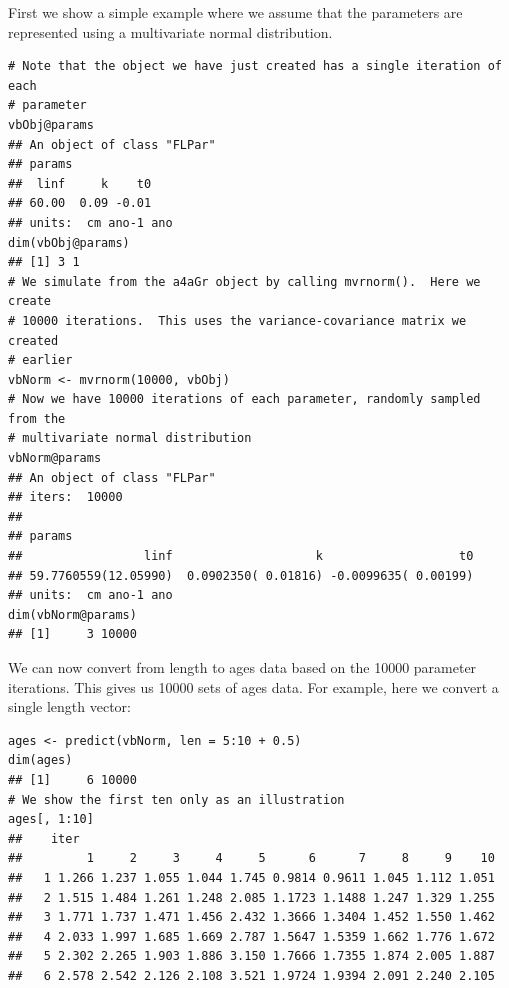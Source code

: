 \documentclass[a4paper,english,10pt]{article}\usepackage[]{graphicx}\usepackage[]{color}
\makeatletter
\newenvironment{kframe}{%
 \def\at@end@of@kframe{}%
 \ifinner\ifhmode%
  \def\at@end@of@kframe{\end{minipage}}%
  \begin{minipage}{\columnwidth}%
 \fi\fi%
 \def\FrameCommand##1{\hskip\@totalleftmargin \hskip-\fboxsep
 \colorbox{shadecolor}{##1}\hskip-\fboxsep
     \hskip-\linewidth \hskip-\@totalleftmargin \hskip\columnwidth}%
 \MakeFramed {\advance\hsize-\width
   \@totalleftmargin\z@ \linewidth\hsize
   \@setminipage}}%
 {\par\unskip\endMakeFramed%
 \at@end@of@kframe}
\newenvironment{knitrout}{}{} %
\newcommand{\code}[1]{{\texttt{#1}}}
\makeatother
\begin{document}
First we show a simple example where we assume that the parameters are represented using a multivariate normal distribution.

\begin{knitrout}
\color{fgcolor}\begin{kframe}
\begin{verbatim}
# Note that the object we have just created has a single iteration of each
# parameter
vbObj@params
## An object of class "FLPar"
## params
##  linf     k    t0 
## 60.00  0.09 -0.01 
## units:  cm ano-1 ano
dim(vbObj@params)
## [1] 3 1
# We simulate from the a4aGr object by calling mvrnorm().  Here we create
# 10000 iterations.  This uses the variance-covariance matrix we created
# earlier
vbNorm <- mvrnorm(10000, vbObj)
# Now we have 10000 iterations of each parameter, randomly sampled from the
# multivariate normal distribution
vbNorm@params
## An object of class "FLPar"
## iters:  10000 
## 
## params
##                 linf                    k                   t0 
## 59.7760559(12.05990)  0.0902350( 0.01816) -0.0099635( 0.00199) 
## units:  cm ano-1 ano
dim(vbNorm@params)
## [1]     3 10000
\end{verbatim}
\end{kframe}
\end{knitrout}


We can now convert from length to ages data based on the 10000 parameter iterations. This gives us 10000 sets of ages data. For example, here we convert a single length vector: 

\begin{knitrout}
\color{fgcolor}\begin{kframe}
\begin{verbatim}
ages <- predict(vbNorm, len = 5:10 + 0.5)
dim(ages)
## [1]     6 10000
# We show the first ten only as an illustration
ages[, 1:10]
##    iter
##         1     2     3     4     5      6      7     8     9    10
##   1 1.266 1.237 1.055 1.044 1.745 0.9814 0.9611 1.045 1.112 1.051
##   2 1.515 1.484 1.261 1.248 2.085 1.1723 1.1488 1.247 1.329 1.255
##   3 1.771 1.737 1.471 1.456 2.432 1.3666 1.3404 1.452 1.550 1.462
##   4 2.033 1.997 1.685 1.669 2.787 1.5647 1.5359 1.662 1.776 1.672
##   5 2.302 2.265 1.903 1.886 3.150 1.7666 1.7355 1.874 2.005 1.887
##   6 2.578 2.542 2.126 2.108 3.521 1.9724 1.9394 2.091 2.240 2.105
\end{verbatim}
\end{kframe}
\end{knitrout}
\end{document}
